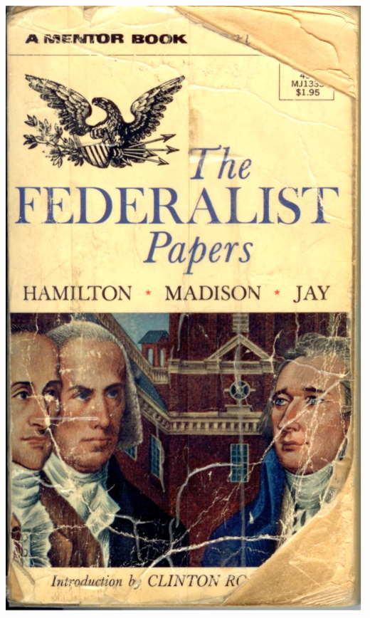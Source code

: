 \begin{frame}
    \centering
    \includegraphics[height=0.95\textheight]{img/fed-papers-copy.jpg} \\
\end{frame}

